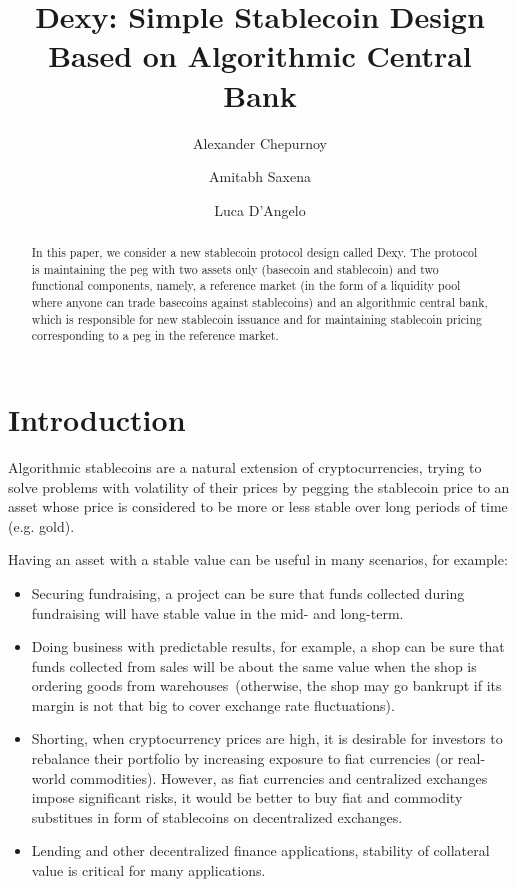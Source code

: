 \documentclass[a4paper,UKenglish,cleveref, autoref, thm-restate]{lipics-v2021}
\title{Dexy: Simple Stablecoin Design Based on Algorithmic Central Bank} %
\author{Alexander Chepurnoy{}}{Ergo Platform}{kushti@protonmail.ch}{}{}%
\author{Amitabh Saxena{}}{Ergo Platform}{}{}{}%
\author{Luca D'Angelo{}}{zenGate Global \and The Stable Order}{ldgaetano@protonmail.com}{}{}
\begin{document}
\maketitle

\begin{abstract}
In this paper, we consider a new stablecoin protocol design called Dexy. The protocol is maintaining the peg with two assets only (basecoin and stablecoin) and two functional components, namely, a reference market (in the form of a liquidity pool where anyone can trade basecoins against stablecoins) and an algorithmic central bank, which is responsible for new stablecoin issuance and for maintaining stablecoin pricing corresponding to a peg in the reference market.
\end{abstract}

\section{Introduction}
\label{sec:introduction}

Algorithmic stablecoins are a natural extension of cryptocurrencies, trying to 
solve problems with volatility of their prices by pegging the stablecoin price to an
asset whose price is considered to be more or less stable over long periods of time (e.g. gold).

Having an asset with a stable value can be useful in many scenarios, for example:
\begin{itemize}
\item Securing fundraising, a project can be sure that funds collected during fundraising will have stable value in the mid- and long-term.
\item Doing business with predictable results, for example, a shop can be sure that funds collected from sales will be about the same value when the shop is ordering goods from warehouses~(otherwise, the shop may go bankrupt if its margin is not that big to cover exchange rate fluctuations). 
\item Shorting, when cryptocurrency prices are high, it is desirable for investors to rebalance their portfolio by increasing exposure to fiat currencies (or real-world commodities). However, as fiat currencies and centralized exchanges impose significant risks, it would be better to buy fiat and commodity substitues in form of stablecoins on decentralized exchanges.
\item Lending and other decentralized finance applications, stability of collateral value is critical for many applications.
\end{itemize}
\end{document}
